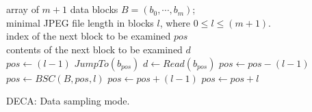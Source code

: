 \documentclass[final,5p,times,twocolumn,authoryear]{elsarticle}
\begin{document}
\begin{algorithm}[ht]
\begin{algorithmic}
    \\
    \INPUT 
    \\ {array of $m+1$ data blocks $B = \left(b_0,\cdots,b_m\right)$;}
    \\ {minimal JPEG file length in blocks $l$, where $0 \le l \leq (m+1)$.}
    \VARIABLES
    \\ {index of the next block to be examined $pos$}
    \\ {contents of the next block to be examined $d$}
    \\
    \State $pos \gets (l-1)$
       \State $JumpTo(b_{pos})$
       \State $d \gets Read(b_{pos})$
          \State $pos \gets pos - (l-1)$
          \State $pos \gets BSC(B,pos,l)$ 
          \State $pos \gets pos + (l-1)$
       \Else
          \State $pos \gets pos + l$
       \EndIf 
    \EndWhile 
\end{algorithmic}
\caption{DECA: Data sampling mode.}
\label{alg:deca-js}
\end{algorithm}
\end{document}
